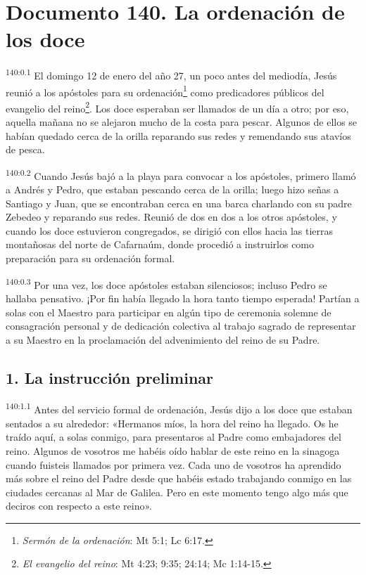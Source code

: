 \chapter{Documento 140. La ordenación de los doce}
\par 
\textsuperscript{140:0.1} El domingo 12 de enero del año 27, un poco antes del mediodía, Jesús reunió a los apóstoles para su ordenación\footnote{\textit{Sermón de la ordenación}: Mt 5:1; Lc 6:17.} como predicadores públicos del evangelio del reino\footnote{\textit{El evangelio del reino}: Mt 4:23; 9:35; 24:14; Mc 1:14-15.}. Los doce esperaban ser llamados de un día a otro; por eso, aquella mañana no se alejaron mucho de la costa para pescar. Algunos de ellos se habían quedado cerca de la orilla reparando sus redes y remendando sus atavíos de pesca.

\par 
\textsuperscript{140:0.2} Cuando Jesús bajó a la playa para convocar a los apóstoles, primero llamó a Andrés y Pedro, que estaban pescando cerca de la orilla; luego hizo señas a Santiago y Juan, que se encontraban cerca en una barca charlando con su padre Zebedeo y reparando sus redes. Reunió de dos en dos a los otros apóstoles, y cuando los doce estuvieron congregados, se dirigió con ellos hacia las tierras montañosas del norte de Cafarnaúm, donde procedió a instruirlos como preparación para su ordenación formal.

\par 
\textsuperscript{140:0.3} Por una vez, los doce apóstoles estaban silenciosos; incluso Pedro se hallaba pensativo. ¡Por fin había llegado la hora tanto tiempo esperada! Partían a solas con el Maestro para participar en algún tipo de ceremonia solemne de consagración personal y de dedicación colectiva al trabajo sagrado de representar a su Maestro en la proclamación del advenimiento del reino de su Padre.

\section*{1. La instrucción preliminar}
\par 
\textsuperscript{140:1.1} Antes del servicio formal de ordenación, Jesús dijo a los doce que estaban sentados a su alrededor: «Hermanos míos, la hora del reino ha llegado. Os he traído aquí, a solas conmigo, para presentaros al Padre como embajadores del reino. Algunos de vosotros me habéis oído hablar de este reino en la sinagoga cuando fuisteis llamados por primera vez. Cada uno de vosotros ha aprendido más sobre el reino del Padre desde que habéis estado trabajando conmigo en las ciudades cercanas al Mar de Galilea. Pero en este momento tengo algo más que deciros con respecto a este reino».

